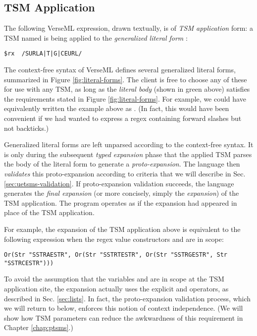 \subsection{TSM Application}\label{sec:uetsms-usage}
The following VerseML expression, drawn textually, is of \emph{TSM application} form: a TSM named  is being applied to the \emph{generalized literal form} :
\begin{lstlisting}[numbers=none,mathescape=|]
$rx  /SURLA|T|G|CEURL/
\end{lstlisting}
The context-free syntax of VerseML defines several generalized literal forms, summarized in Figure \ref{fig:literal-forms}. The client is free to choose any of these for use with any TSM, as long as the \emph{literal body} (shown in green above) satisfies the requirements stated in Figure \ref{fig:literal-forms}. For example, we could have equivalently written the example above as . (In fact, this would have been convenient if we had wanted to express a regex containing forward slashes but not backticks.) 

Generalized literal forms are left unparsed according to the context-free syntax. It is only during the subsequent \emph{typed expansion} phase that the applied TSM parses the {body} of the literal form to generate a \emph{proto-expansion}. The language then \emph{validates} this proto-expansion according to criteria that we will describe in Sec. \ref{sec:uetsms-validation}. If proto-expansion validation succeeds, the language generates the \emph{final expansion} (or more concisely, simply the \emph{expansion}) of the TSM application. The program operates as if the expansion had appeared in place of the TSM application. 

For example, the expansion of the TSM application above is equivalent to the following expression when the regex value constructors  and  are in scope:
\begin{lstlisting}[numbers=none]
Or(Str "SSTRAESTR", Or(Str "SSTRTESTR", Or(Str "SSTRGESTR", Str "SSTRCESTR")))
\end{lstlisting}
To avoid the assumption that the variables  and  are in scope at the TSM application site, the expansion actually uses the explicit  and  operators, as described in Sec. \ref{sec:lists}. In fact, the proto-expansion validation process, which we will return to below, enforces this notion of context independence. (We will show how TSM parameters can reduce the awkwardness of this requirement in Chapter \ref{chap:ptsms}.)

